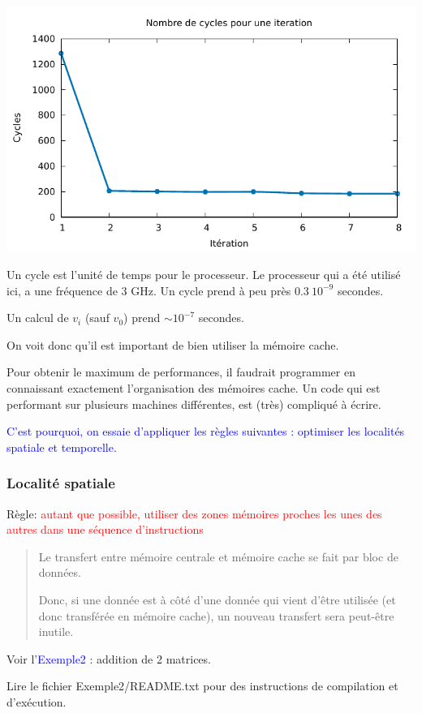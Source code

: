\documentclass{beamer}
\begin{document}
\begin{frame}
	\begin{center}
	\includegraphics[scale=0.8]{Exemples/Exemple1/cycles.pdf}
	\end{center}

Un cycle est l'unité de temps pour le processeur. Le processeur qui a été utilisé ici, a une fréquence de 3 GHz.
Un cycle prend à peu près $0.3\ 10^{-9}$ secondes. 
\vfill

Un calcul de $v_i$ (sauf $v_0$) prend $\sim 10^{-7}$ secondes.
\end{frame}

\begin{frame}
\vfill
On voit donc qu'il est important de bien utiliser la mémoire cache.
\vfill

Pour obtenir le maximum de performances, il faudrait programmer en connaissant exactement l'organisation des mémoires cache. Un code qui est performant sur plusieurs machines différentes, est (très) compliqué à écrire.

\vfill
   \textcolor{blue}{C'est pourquoi, on essaie d'appliquer les règles suivantes : optimiser les localités spatiale et temporelle.}
\vfill 
\end{frame}

\begin{frame}
\frametitle{Localit\'e spatiale}
Règle:  \textcolor{red}{autant que possible, utiliser des zones m\'emoires proches les unes des autres dans une s\'equence d'instructions}
	\vfill
\begin{quote}
	Le transfert entre m\'emoire centrale et m\'emoire cache se fait par bloc de donn\'ees.
	
	Donc, si une donn\'ee est \`a c\^ot\'e d'une donn\'ee qui vient d'\^etre utilis\'ee (et donc transf\'er\'ee en m\'emoire cache), un nouveau transfert sera peut-\^etre inutile.
\end{quote}

\vfill
Voir l'\textcolor{blue}{Exemple2} : addition de 2 matrices.

Lire le fichier Exemple2/README.txt pour des instructions de compilation et d'exécution.
\end{frame}
\end{document}
